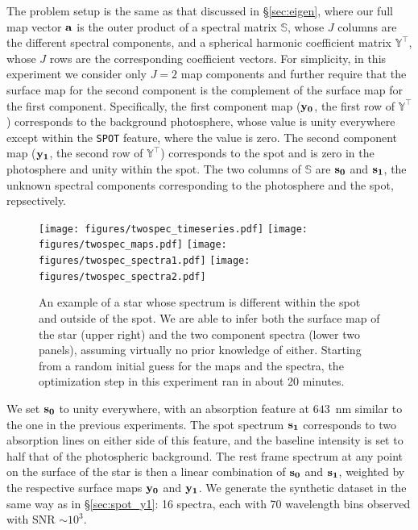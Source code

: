 \documentclass[modern]{aastex631}
\def\timeInferTwoSpec{about 20 minutes\xspace}
\begin{document}
The problem setup is the same as that discussed in \S\ref{sec:eigen}, where our full map vector ${\mathbf{a}}$ is the outer product of a spectral matrix $\mathbb{S}$, whose $J$ columns are the different spectral components, and a spherical harmonic coefficient matrix $\mathbb{Y}^\top$, whose $J$ rows are the corresponding coefficient vectors. 
For simplicity, in this experiment we consider only $J = 2$ map components and further require that the surface map for the second component is the complement of the surface map for the first component.
Specifically, the first component map (${\mathbf{y_0}}$, the first row of $\mathbb{Y}^\top$) corresponds to the background photosphere, whose value is unity everywhere except within the \texttt{SPOT} feature, where the value is zero.
The second component map (${\mathbf{y_1}}$, the second row of $\mathbb{Y}^\top$) corresponds to the spot and is zero in the photosphere and unity within the spot.
The two columns of $\mathbb{S}$ are ${\mathbf{s_0}}$ and ${\mathbf{s_1}}$, the unknown spectral components corresponding to the photosphere and the spot, repsectively.
%
\begin{figure}[p!]
    \begin{centering}
        \texttt{[image: figures/twospec\_timeseries.pdf]}
        \texttt{[image: figures/twospec\_maps.pdf]}
        \texttt{[image: figures/twospec\_spectra1.pdf]}
        \texttt{[image: figures/twospec\_spectra2.pdf]}
        \caption{%
            An example of a star whose spectrum is different within the spot and outside of the spot.
            We are able to infer both the surface map of the star (upper right) and the two component spectra (lower two panels), assuming virtually no prior knowledge of either.
            Starting from a random initial guess for the maps and the spectra, the optimization step in this experiment ran in \timeInferTwoSpec.
        }
        \label{fig:twospec}
    \end{centering}
\end{figure}
%
We set ${\mathbf{s_0}}$ to unity everywhere, with an absorption feature at $643$~nm similar to the one in the previous experiments.
The spot spectrum ${\mathbf{s_1}}$ corresponds to two absorption lines on either side of this feature, and the baseline intensity is set to half that of the photospheric background.
%
The rest frame spectrum at any point on the surface of the star is then a linear combination of ${\mathbf{s_0}}$ and ${\mathbf{s_1}}$, weighted by the respective surface maps ${\mathbf{y_0}}$ and ${\mathbf{y_1}}$.
%
We generate the synthetic dataset in the same way as in \S\ref{sec:spot_y1}: 16 spectra, each with 70 wavelength bins observed with SNR $\sim 10^{3}$.
\end{document}
